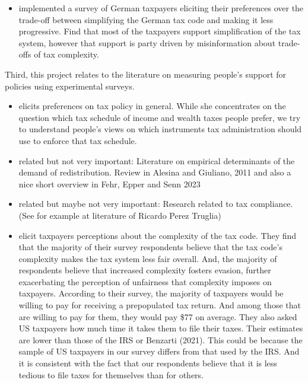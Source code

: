 \documentclass[12pt]{article}
\begin{document}
\begin{itemize}
    \item \textcite{blesse2019people} implemented a survey of German taxpayers eliciting their preferences over the trade-off between simplifying the German tax code and making it less progressive. Find that most of the taxpayers support simplification of the tax system, however that support is party driven by misinformation about trade-offs of tax complexity. 
\end{itemize}

Third, this project relates to the literature on measuring people's support for policies using experimental surveys. 
\begin{itemize}
    \item \textcite{stantcheva2021understanding} elicits preferences on tax policy in general. While she concentrates on the question which tax schedule of income and wealth taxes people prefer, we try to understand people's views on which instruments tax administration should use to enforce that tax schedule. 
    \item related but not very important: Literature on empirical determinants of the demand of redistribution. Review in Alesina and Giuliano, 2011 and also a nice short overview in Fehr, Epper and Senn 2023
    \item related but maybe not very important: Research related to tax compliance.  (See for example at literature of Ricardo Perez Truglia)
    \item \textcite{benzarti2024rising} elicit taxpayers perceptions about the complexity of the tax code. They find that the majority of their survey respondents believe that the tax code’s complexity makes the tax system less fair overall. And, the majority of respondents believe that increased complexity fosters evasion, further exacerbating the perception of unfairness that complexity imposes on taxpayers. According to their survey, the majority of taxpayers would be willing to pay for receiving a prepopulated tax return. And among those that are willing to pay for them, they would pay \$77 on average. They also asked US taxpayers how much time it takes them to file their taxes. Their estimates are lower than those of the IRS or Benzarti (2021). This could be because the sample of US taxpayers in our survey differs from that used by the IRS. And it is consistent with the fact that our respondents believe that it is less tedious to file taxes for themselves than for others.
\end{itemize}
 
\end{document}
